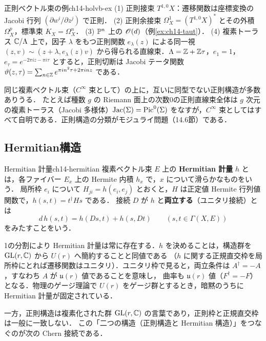 \begin{myex}{正則ベクトル束の例}{ch14-holvb-ex}
(1) 正則接束 $T^{1,0}X$：遷移関数は座標変換の Jacobi 行列 $(\partial w^i/\partial z^j)$ で正則．
(2) 正則余接束 $\Omega^1_X=(T^{1,0}X)^*$ とその外積 $\Omega^p_X$，標準束 $K_X=\Omega^n_X$．
(3) $\mathbb{P}^n$ 上の $\mathscr{O}(d)$（例\ref{ex:ch14-taut}）．
(4) 複素トーラス $\mathbb{C}/\Lambda$ 上で，因子 $\lambda$ をもつ正則関数 $e_\lambda(z)$ による同一視 $(z,v)\sim(z+\lambda,e_\lambda(z)v)$ から得られる直線束．$\Lambda=\mathbb{Z}+\mathbb{Z}\tau$，$e_1=1$，$e_\tau = e^{-2\pi i z - \pi i\tau}$ とすると，正則切断は Jacobi テータ関数 $\vartheta(z,\tau)=\sum_{n\in\mathbb{Z}}e^{\pi i n^2\tau+2\pi i n z}$ である．
\end{myex}

同じ複素ベクトル束（$C^\infty$ 束として）の上に，互いに同型でない正則構造が多数ありうる．
たとえば種数 $g$ の Riemann 面上の次数0の正則直線束全体は $g$ 次元の複素トーラス（Jacobi 多様体）$\mathrm{Jac}(\Sigma)=\operatorname{Pic}^0(\Sigma)$
をなすが，$C^\infty$ 束としてはすべて自明である．正則構造の分類がモジュライ問題（14.6節）である．

\subsection{Hermitian構造}

\begin{mydef}{Hermitian 計量}{ch14-hermitian}
複素ベクトル束 $E$ 上の \textbf{Hermitian 計量} $h$ とは，各ファイバー $E_x$ 上の Hermite 内積 $h_x$ で，$x$ について滑らかなものをいう．
局所枠 $e_i$ について $H_{ji}=h(e_i,e_j)$ とおくと，$H$ は正定値 Hermite 行列値関数で，$h(s,t)=t^\dagger H s$ である．
接続 $D$ が $h$ と\textbf{両立する}（ユニタリ接続）とは
\begin{equation}
  d\,h(s,t) = h(Ds,t) + h(s,Dt)\qquad(s,t\in\Gamma(X,E))
\end{equation}
をみたすことをいう．
\end{mydef}

1の分割により Hermitian 計量は常に存在する．$h$ を決めることは，構造群を $\operatorname{GL}(r,\mathbb{C})$ から $U(r)$ へ簡約することと同値である
（$h$ に関する正規直交枠を局所枠にとれば遷移関数はユニタリ）．ユニタリ枠で見ると，両立条件は $A^\dagger=-A$，すなわち $A$ が $\mathfrak{u}(r)$ 値であることを意味し，
曲率も $\mathfrak{u}(r)$ 値（$F^\dagger=-F$）となる．物理のゲージ理論で $U(r)$ をゲージ群とするとき，暗黙のうちに Hermitian 計量が固定されている．

一方，正則構造は複素化された群 $\operatorname{GL}(r,\mathbb{C})$ の言葉であり，正則枠と正規直交枠は一般に一致しない．
この「二つの構造（正則構造と Hermitian 構造）」をつなぐのが次の Chern 接続である．

